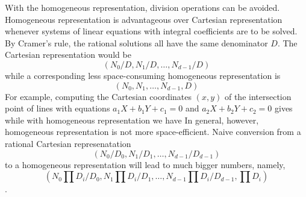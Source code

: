 With the homogeneous representation, division operations%
 can be avoided.
Homogeneous representation is advantageous over Cartesian representation
whenever systems of linear equations with integral coefficients
are to be solved. By Cramer's rule,
the rational solutions%
 all have the same denominator $D$.
The Cartesian representation would be
$$(N_0/D, N_1/D, \ldots, N_{d-1}/D)$$
while a corresponding less space-consuming homogeneous representation is 
$$(N_0, N_1, \ldots, N_{d-1}, D)$$
For example, computing the Cartesian coordinates $(x,y)$ of the
intersection point  of lines with equations
$a_1 X + b_1 Y + c_1 = 0$ and $a_2 X + b_2 Y + c_2 = 0$ gives
while with homogeneous representation we have
In general, however, homogeneous representation is not more space-efficient.
Naive conversion from a rational Cartesian represenatation 
$$(N_0/D_0, N_1/D_1, \ldots, N_{d-1}/D_{d-1})$$ to a homogeneous
representation will lead to much bigger numbers, namely,
$$\textstyle
(N_0 \prod D_i /D_0, N_1\prod D_i /D_1, \ldots, N_{d-1}\prod D_i /D_{d-1},
\prod D_i )$$. 

